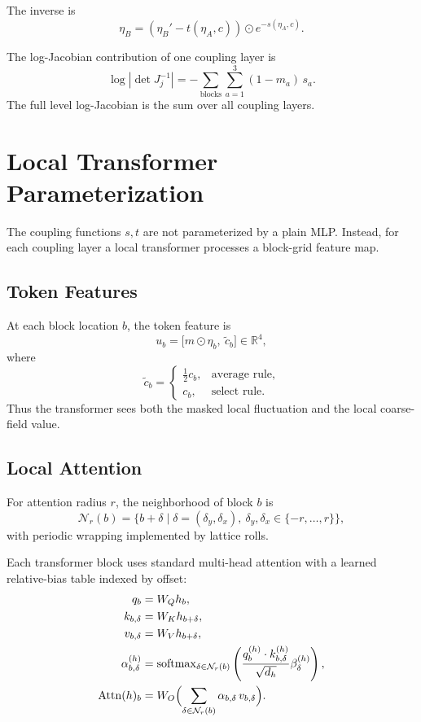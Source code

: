 \documentclass[11pt]{article}
\begin{document}
The inverse is
\begin{equation}
\eta_B = (\eta_B' - t(\eta_A,c)) \odot e^{-s(\eta_A,c)}.
\end{equation}

The log-Jacobian contribution of one coupling layer is
\begin{equation}
\log \left|\det J_j^{-1}\right|
= -\sum_{\text{blocks}}\sum_{a=1}^{3}(1-m_a)\,s_a.
\end{equation}
The full level log-Jacobian is the sum over all coupling layers.

\section{Local Transformer Parameterization}

The coupling functions $s,t$ are not parameterized by a plain MLP. Instead,
for each coupling layer a local transformer processes a block-grid feature map.

\subsection{Token Features}

At each block location $b$, the token feature is
\begin{equation}
u_b = \bigl[m\odot \eta_b,\ \tilde c_b\bigr]\in\mathbb{R}^4,
\end{equation}
where
\[
\tilde c_b=
\begin{cases}
\tfrac12 c_b,& \text{average rule,} \\
c_b,& \text{select rule.}
\end{cases}
\]
Thus the transformer sees both the masked local fluctuation and the local
coarse-field value.

\subsection{Local Attention}

For attention radius $r$, the neighborhood of block $b$ is
\begin{equation}
\mathcal N_r(b)=\{b+\delta \mid \delta=(\delta_y,\delta_x),\ 
\delta_y,\delta_x\in\{-r,\dots,r\}\},
\end{equation}
with periodic wrapping implemented by lattice rolls.

Each transformer block uses standard multi-head attention with a learned
relative-bias table indexed by offset:
\begin{align}
q_b &= W_Q h_b, \\
k_{b,\delta} &= W_K h_{b+\delta}, \\
v_{b,\delta} &= W_V h_{b+\delta}, \\
\alpha_{b,\delta}^{(h)} &=
\mathrm{softmax}_{\delta\in\mathcal N_r(b)}
\left(
\frac{q_b^{(h)}\cdot k_{b,\delta}^{(h)}}{\sqrt{d_h}}
\beta_{\delta}^{(h)}
\right), \\
\mathrm{Attn}(h)_b &=
W_O \Bigl(\sum_{\delta\in\mathcal N_r(b)}
\alpha_{b,\delta}\,v_{b,\delta}\Bigr).
\end{align}
\end{document}
